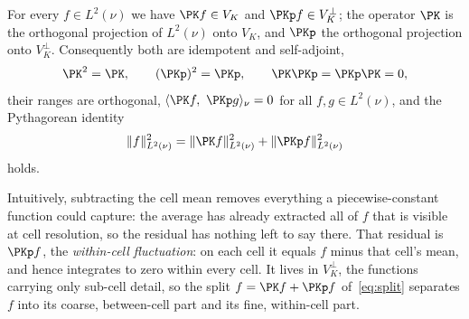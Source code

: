 \begin{lemma}
\label{lem:projection}
For every $f\in L^2(\nu)$ we have $\PK f\in V_K$ and $\PKp f\in
V_K^{\perp}$; the operator $\PK$ is the orthogonal projection of
$L^2(\nu)$ onto $V_K$, and $\PKp$ the orthogonal projection onto
$V_K^{\perp}$. Consequently both are idempotent and self-adjoint,
\[
  \PK^2=\PK,\qquad (\PKp)^2=\PKp,\qquad \PK\PKp=\PKp\PK=0,
\]
their ranges are orthogonal, $\langle \PK f,\ \PKp g\rangle_\nu=0$ for all
$f,g\in L^2(\nu)$, and the Pythagorean identity
\begin{equation}
  \|f\|_{L^2(\nu)}^2=\|\PK f\|_{L^2(\nu)}^2+\|\PKp f\|_{L^2(\nu)}^2
  \label{eq:pythagoras}
\end{equation}
holds.
\end{lemma}

Intuitively, subtracting the cell mean removes everything a
piecewise-constant function could capture: the average has already
extracted all of $f$ that is visible at cell resolution, so the residual
has nothing left to say there. That residual is $\PKp f$, the
\emph{within-cell fluctuation}: on each cell it equals $f$ minus that
cell's mean, and hence integrates to zero within every cell. It lives in
$V_K^{\perp}$, the functions carrying only sub-cell detail, so the split
$f=\PK f+\PKp f$ of~\eqref{eq:split} separates $f$ into its coarse,
between-cell part and its fine, within-cell part.

